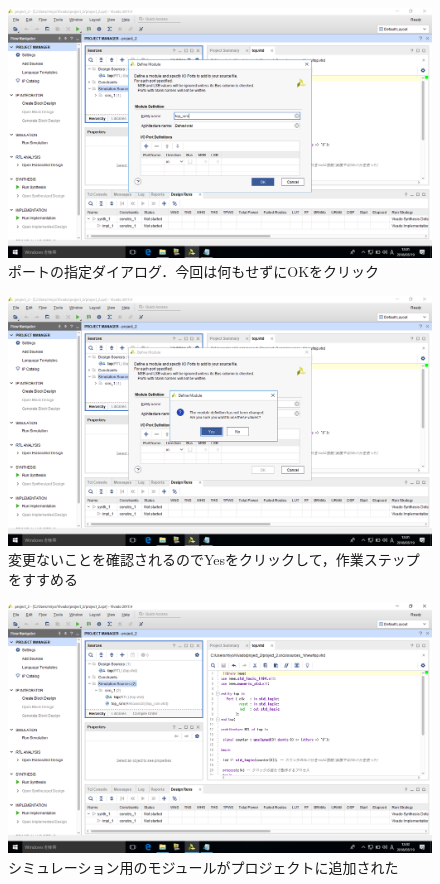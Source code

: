 \documentclass[a4paper,dvipdfmx]{jsarticle}
\begin{document}
 \begin{figure}[H]
  \begin{center}
   \includegraphics[width=.8\textwidth]{chapter04_figures/VirtualBox_Windows10_19_03_2018_12_01_49.png}
  \end{center}
  \caption{ポートの指定ダイアログ．今回は何もせずにOKをクリック}
 \end{figure}

 \begin{figure}[H]
  \begin{center}
   \includegraphics[width=.8\textwidth]{chapter04_figures/VirtualBox_Windows10_19_03_2018_12_01_54.png}
  \end{center}
  \caption{変更ないことを確認されるのでYesをクリックして，作業ステップをすすめる}
 \end{figure}

 \begin{figure}[H]
  \begin{center}
   \includegraphics[width=.8\textwidth]{chapter04_figures/VirtualBox_Windows10_19_03_2018_12_02_05.png}
  \end{center}
  \caption{シミュレーション用のモジュールがプロジェクトに追加された}
 \end{figure}
\end{document}
